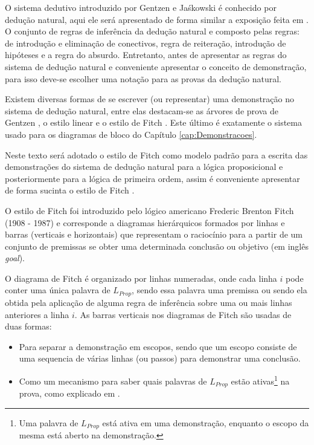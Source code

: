 O sistema dedutivo introduzido por Gentzen e Jaśkowski é conhecido por dedução natural, aqui ele será apresentado de forma similar a exposição feita em \cite{joaoPavao2014}. O conjunto de regras de inferência da dedução natural e composto pelas regras: de introdução e eliminação de conectivos, regra de reiteração, introdução de hipóteses e a regra do absurdo. Entretanto, antes de apresentar as regras do sistema de dedução natural e conveniente apresentar o conceito de demonstração, para isso deve-se escolher uma notação para as provas da dedução natural.

Existem diversas formas de se escrever (ou representar) uma demonstração no sistema de dedução natural, entre elas destacam-se as árvores de prova de Gentzen \cite{BenjaV1}, o estilo linear \cite{copi1981, mortari2001} e o estilo de Fitch \cite{joaoPavao2014, fitch1953}. Este último é exatamente o sistema usado para os diagramas de bloco do Capítulo \ref{cap:Demonstracoes}.

Neste texto será adotado o estilo de Fitch como modelo padrão para a escrita das demonstrações do sistema de dedução natural para a lógica proposicional e posteriormente para a lógica de primeira ordem, assim é conveniente apresentar de forma sucinta o estilo de Fitch  \cite{broda2007}.

O estilo de Fitch foi introduzido pelo lógico americano Frederic Brenton Fitch (1908 - 1987) e corresponde a diagramas hierárquicos formados por linhas e barras (verticais e horizontais) que representam o raciocínio para a partir de um conjunto de premissas se obter uma determinada conclusão ou objetivo (em inglês \textit{goal}).

O diagrama de Fitch é organizado por linhas numeradas, onde cada linha $i$ pode conter uma única palavra de $L_{Prop}$, sendo essa palavra uma premissa ou sendo ela obtida pela aplicação de alguma regra de inferência sobre uma ou mais linhas anteriores a linha $i$. As barras verticais nos diagramas de Fitch são usadas de duas formas:
\begin{itemize}
	\item[(1)] Para separar a demonstração em escopos, sendo que um escopo consiste de uma sequencia de várias linhas (ou passos) para demonstrar uma conclusão.
	\item[(2)] Como um mecanismo para saber quais palavras de $L_{Prop}$ estão ativas\footnote{Uma palavra de $L_{Prop}$ está ativa em uma demonstração, enquanto o escopo da mesma está aberto na demonstração.} na prova, como explicado em \cite{joaoPavao2014}. 
\end{itemize}

